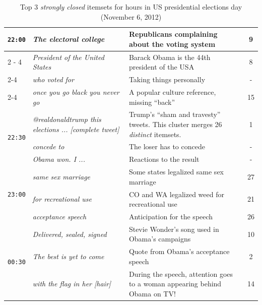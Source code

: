 \documentclass{sig-alternate}
\begin{document}
\begin{table}
\begin{center}
\begin{tabular}{|p{0.7cm}|p{2.5cm}|p{4cm}|c|}
\multirow{5}{*}{\texttt{22:00}} 
& \em The electoral college &  Republicans complaining about the voting system  & 9 \\ \cline{2 - 4}
& \em President of the United States & Barack Obama is the 44th president of the USA   & 8 \\ \cline{2-4} 
& \em who voted for & Taking things personally & - \\ \cline{2-4} 
& \em once you go black you never go & A popular culture reference, missing ``back''& 15 \\ 
 \hline %

\multirow{3}{*}{\texttt{22:30} }
& \em @realdonaldtrump this elections ... [complete tweet]	& Trump's ``sham and travesty'' tweets. This cluster merges 26 \emph{distinct} itemsets. & 1  \\ \cline{2-4}
& \em concede to & The loser has to concede  & - \\ \cline{2-4} 
& \em Obama won. I ... & Reactions to the result & - \\ \hline 

\multirow{3}{*}{\texttt{23:00} }
& \em same sex marriage	& Some states legalized same sex marriage & 27  \\ \cline{2-4}
& \em for recreational use & CO and WA legalized weed for recreational use   & 21 \\ \cline{2-4} 
& \em acceptance speech & Anticipation for the speech & 26 \\ \hline 

\multirow{3}{*}{\texttt{00:30} }
& \em Delivered, sealed, signed & Stevie Wonder's song used in Obama's campaigns & 10  \\ \cline{2-4}
& \em The best is yet to come & Quote from Obama's acceptance speech  & 2 \\ \cline{2-4} 
& \em with the flag in her [hair]	&  During the speech, attention goes to a woman appearing behind Obama on TV! & 14 \\ \hline 
						
\end{tabular}
\end{center}
\vspace{-5mm}
\caption{Top 3 \emph{strongly closed} itemsets for hours in US presidential elections day (November 6, 2012)} 
 \label{table:nov6}
\end{table}
\end{document}
